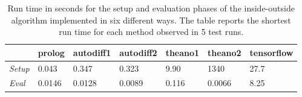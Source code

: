 \begin{table}
	\begin{center}
		\begin{tabular}{@{}l@{\quad}llllll@{}}
			\hline \rule{0pt}{1.15em}
						& prolog & autodiff1 & autodiff2 & theano1 & theano2 & tensorflow \\[0.15em]
			\hline\rule{0pt}{1.15em}%
			\emph{Setup} & 0.043  & 0.347     & 0.323     & 9.90    & 1340       & 27.7  \\%
			\emph{Eval}  & 0.0146 & 0.0128   & 0.0089     & 0.116   & 0.0066     & 8.25 \\[0.15em]%
			\hline 
		\end{tabular}
	\end{center}
	\caption{Run time in seconds for the setup and evaluation phases of
	the inside-outside algorithm implemented in six different ways. The table
	reports the shortest run time for each method observed in 5 test runs.}
\end{table}

